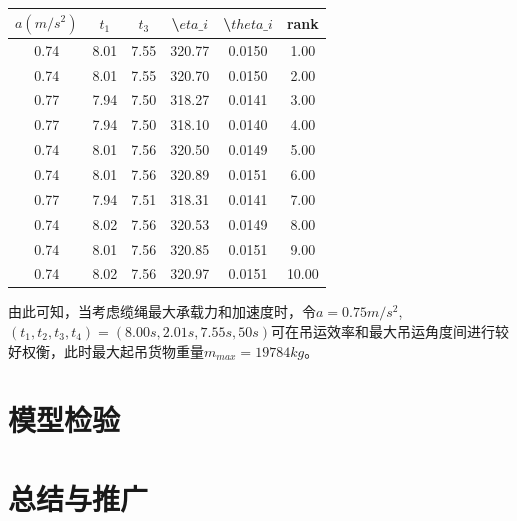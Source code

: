 \documentclass[withoutpreface,bwprint]{cumcmthesis} %
\begin{document}
\begin{table}[!h]
    \centering
\begin{tabular}{|c|c|c|c|c|c|}
    \hline
$a(m/s^2)$ & $t_1$ & $t_3$ & \textbackslash{}$eta\_i$ & \textbackslash{}$theta\_i$ & rank  \\ \hline
0.74       & 8.01  & 7.55  & 320.77                 & 0.0150                   & 1.00  \\ \hline
0.74       & 8.01  & 7.55  & 320.70                 & 0.0150                   & 2.00  \\ \hline
0.77       & 7.94  & 7.50  & 318.27                 & 0.0141                   & 3.00  \\ \hline
0.77       & 7.94  & 7.50  & 318.10                 & 0.0140                   & 4.00  \\ \hline
0.74       & 8.01  & 7.56  & 320.50                 & 0.0149                   & 5.00  \\ \hline
0.74       & 8.01  & 7.56  & 320.89                 & 0.0151                   & 6.00  \\ \hline
0.77       & 7.94  & 7.51  & 318.31                 & 0.0141                   & 7.00  \\ \hline
0.74       & 8.02  & 7.56  & 320.53                 & 0.0149                   & 8.00  \\ \hline
0.74       & 8.01  & 7.56  & 320.85                 & 0.0151                   & 9.00  \\ \hline
0.74       & 8.02  & 7.56  & 320.97                 & 0.0151                   & 10.00 \\ \hline
\end{tabular}
\end{table}
\newpage
由此可知，当考虑缆绳最大承载力和加速度时，令$a=0.75m/s^2$,$(t_1,t_2,t_3,t_4)=(8.00s,2.01s,7.55s,50s)$可在吊运效率和最大吊运角度间进行较好权衡，此时最大起吊货物重量$m_{max}=19784kg$。


\section{模型检验}
\subsection{}
\section{总结与推广}
\end{document}
